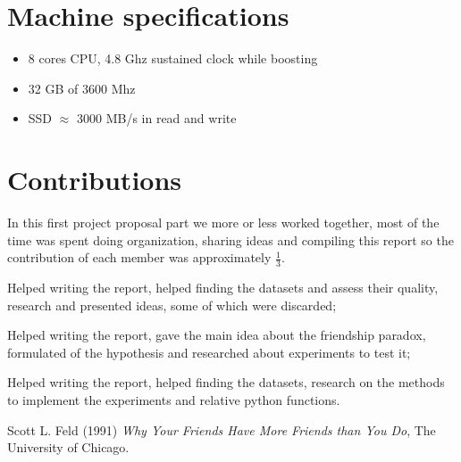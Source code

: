 \documentclass{article}
\begin{document}
\section{Machine specifications}
\begin{itemize}
    \item 8 cores CPU, 4.8 Ghz sustained clock while boosting
    \item 32 GB of 3600 Mhz 
    \item SSD $\approx$ 3000 MB/s in read and write
\end{itemize}
\section*{Contributions}
In this first project proposal part we more or less worked together, most of the time was spent doing organization, sharing ideas and compiling this report so the contribution of each member was approximately $\frac{1}{3}$.
\begin{description}[font=\normalfont\itshape]
    \item[Lavorati Ippolito:] Helped writing the report, helped finding the datasets and assess their quality, research and presented ideas, some of which were discarded;
    \item[Orsolon Ludovico:] Helped writing the report, gave the main idea about the friendship paradox, formulated of the hypothesis and researched about experiments to test it;
    \item[Stefani Patrizia:] Helped writing the report, helped finding the datasets, research on the methods to implement the experiments and relative python functions.
\end{description}
\begin{thebibliography}{9}
Scott L. Feld (1991) \emph{Why Your Friends Have More Friends
than You Do}, The University of Chicago.
\end{thebibliography}
\end{document}
